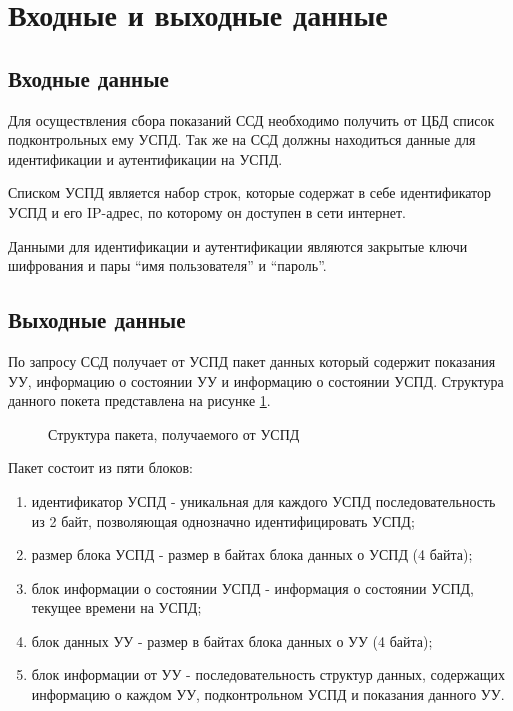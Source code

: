 \newpage
\section{Входные и выходные данные}
\setcounter{figure}{0}

\subsection{Входные данные}
Для осуществления сбора показаний ССД необходимо получить от ЦБД список подконтрольных ему УСПД. Так же на ССД должны находиться данные для идентификации и аутентификации на УСПД. 

Списком УСПД является набор строк, которые содержат в себе идентификатор УСПД и его IP-адрес, по которому он доступен в сети интернет. 

Данными для идентификации и аутентификации являются закрытые ключи шифрования и пары ``имя пользователя'' и ``пароль''.


\subsection{Выходные данные}

По запросу ССД получает от УСПД пакет данных который содержит показания УУ, информацию о состоянии УУ и информацию о состоянии УСПД. Структура данного покета представлена на рисунке \ref{img:answer_struct}.

\begin{figure}[!ht]
 \caption{Структура пакета, получаемого от УСПД}
 \label{img:answer_struct}
\end{figure}

Пакет состоит из пяти блоков:

\begin{enumerate}
 \item идентификатор УСПД - уникальная для каждого УСПД последовательность из 2 байт, позволяющая однозначно идентифицировать УСПД;
 \item размер блока УСПД - размер в байтах блока данных о УСПД (4 байта);
 \item блок информации о состоянии УСПД - информация о состоянии УСПД, текущее времени на УСПД;
 \item блок данных УУ - размер в байтах блока данных о УУ (4 байта);
 \item блок информации от УУ - последовательность структур данных, содержащих информацию о каждом УУ, подконтрольном УСПД и показания данного УУ.
\end{enumerate}

